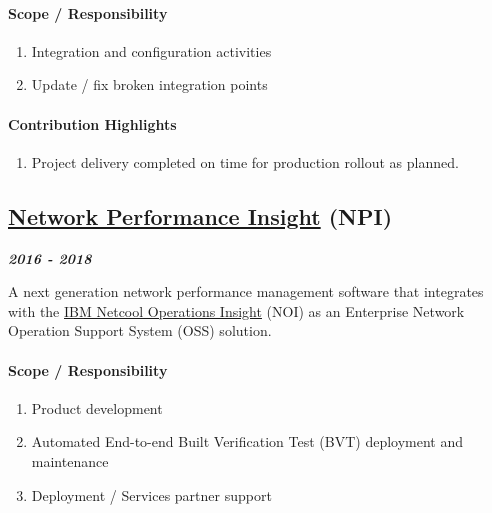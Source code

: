 \documentclass[
]{article}
\providecommand{\tightlist}{%
  \setlength{\itemsep}{0pt}\setlength{\parskip}{0pt}}
\begin{document}
\hypertarget{scope-responsibility-5}{%
\paragraph{Scope / Responsibility}\label{scope-responsibility-5}}

\begin{enumerate}
\def\labelenumi{\arabic{enumi}.}
\tightlist
\item
  Integration and configuration activities
\item
  Update / fix broken integration points
\end{enumerate}

\hypertarget{contribution-highlights-4}{%
\paragraph{Contribution Highlights}\label{contribution-highlights-4}}

\begin{enumerate}
\def\labelenumi{\arabic{enumi}.}
\tightlist
\item
  Project delivery completed on time for production rollout as planned.
\end{enumerate}

\hypertarget{network-performance-insight-npi}{%
\subsection{\texorpdfstring{\href{https://www.ibm.com/support/knowledgecenter/en/SSCVHB_1.2.2/product_overview/cnpi_preface_comp_suite1.html}{Network
Performance Insight}
(NPI)}{Network Performance Insight (NPI)}}\label{network-performance-insight-npi}}

\textbf{\emph{2016 - 2018}}

A next generation network performance management software that
integrates with the
\href{http://www-03.ibm.com/software/products/en/netcool-operations-insight}{IBM
Netcool Operations Insight} (NOI) as an Enterprise Network Operation
Support System (OSS) solution.

\hypertarget{scope-responsibility-6}{%
\paragraph{Scope / Responsibility}\label{scope-responsibility-6}}

\begin{enumerate}
\def\labelenumi{\arabic{enumi}.}
\tightlist
\item
  Product development
\item
  Automated End-to-end Built Verification Test (BVT) deployment and
  maintenance
\item
  Deployment / Services partner support
\end{enumerate}
\end{document}
